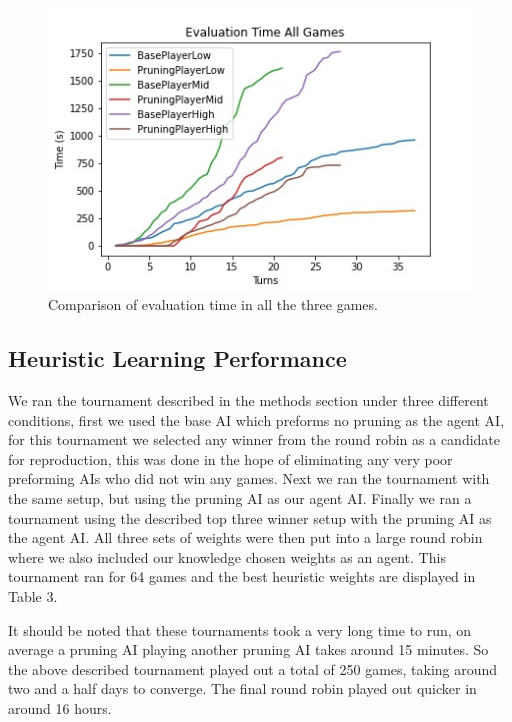 \documentclass[letterpaper]{article}
\begin{document}
\begin{figure}
    \center

    \includegraphics[scale = 0.4]{all_game_time.jpg}
    
  
    \caption{Comparison of evaluation time in all the three games.} 
\end{figure}



\subsection{Heuristic Learning Performance}
We ran the tournament described in the methods section under three different conditions, first we used the base AI which preforms no pruning as the agent AI, for this tournament we selected any winner from the round robin as a candidate for reproduction, this was done in the hope of eliminating any very poor preforming AIs who did not win any games. Next we ran the tournament with the same setup, but using the pruning AI as our agent AI. Finally we ran a tournament using the described top three winner setup with the pruning AI as the agent AI. All three sets of weights were then put into a large round robin where we also included our knowledge chosen weights as an agent. This tournament ran for 64 games and the best heuristic weights are displayed in Table 3. 

It should be noted that these tournaments took a very long time to run, on average a pruning AI playing another pruning AI takes around 15 minutes. So the above described tournament played out a total of 250 games, taking around two and a half days to converge. The final round robin played out quicker in around 16 hours.

\begin{table}[t]
    \centering
    \caption{Learned Heuristic Weights}
    \label{tab:my_label}
\end{table}
\end{document}
